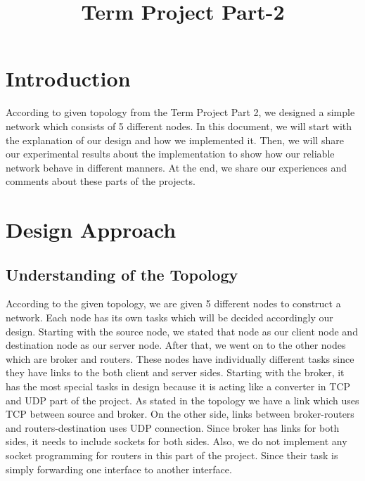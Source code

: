 \documentclass[conference]{IEEEtran}
\begin{document}
\title{Term Project Part-2\\
{\footnotesize }
}

\author{
\and
{}
}

\maketitle


\section{Introduction}
According to given topology from the Term Project Part 2, we designed a simple network which consists of 5 different nodes. In this document, we will start with the explanation of our design and how we implemented it. Then, we will share our experimental results about the implementation to show how our reliable network behave in different manners. At the end, we share our experiences and comments about these parts of the projects.

\section{Design Approach}

\subsection{Understanding of the Topology}

According to the given topology, we are given 5 different nodes to construct a network. Each node has its own tasks which will be decided accordingly our design. Starting with the source node, we stated that node as our client node and destination node as our server node. After that, we went on to the other nodes which are broker and routers. These nodes have individually different tasks since they have links to the both client and server sides. Starting with the broker, it has the most special tasks in design because it is acting like a converter in TCP and UDP part of the project. As stated in the topology we have a link which uses TCP between source and broker. On the other side, links between broker-routers and routers-destination uses UDP connection. Since broker has links for both sides, it needs to include sockets for both sides. Also, we do not implement any socket programming for routers in this part of the project. Since their task is simply forwarding one interface to another interface.
\end{document}
